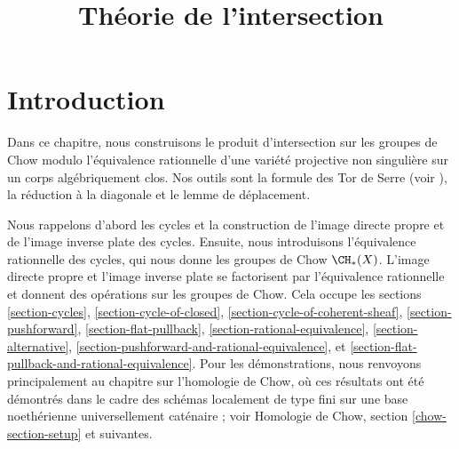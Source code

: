 

%


\title{Théorie de l'intersection}


\maketitle

\label{section-phantom}

\tableofcontents


\section{Introduction}
\label{section-introduction}

\noindent
Dans ce chapitre, nous construisons le produit d'intersection sur les groupes de Chow
modulo l'équivalence rationnelle d'une variété projective non singulière sur un
corps algébriquement clos. Nos outils sont la formule des Tor de Serre
(voir \cite[chapitre V]{Serre_algebre_locale}), la réduction à la diagonale
et le lemme de déplacement.

\medskip\noindent
Nous rappelons d'abord les cycles et la construction de l'image directe propre et de
l'image inverse plate des cycles. Ensuite, nous introduisons l'équivalence rationnelle des cycles,
qui nous donne les groupes de Chow $\CH_*(X)$. L'image directe propre et l'image inverse plate
se factorisent par l'équivalence rationnelle et donnent des opérations sur les groupes de Chow.
Cela occupe les sections
\ref{section-cycles},
\ref{section-cycle-of-closed},
\ref{section-cycle-of-coherent-sheaf},
\ref{section-pushforward},
\ref{section-flat-pullback},
\ref{section-rational-equivalence},
\ref{section-alternative},
\ref{section-pushforward-and-rational-equivalence}, et
\ref{section-flat-pullback-and-rational-equivalence}.
Pour les démonstrations, nous renvoyons principalement au chapitre sur l'homologie de Chow,
où ces résultats ont été démontrés dans le cadre des
schémas localement de type fini sur une base noethérienne universellement caténaire ; voir
Homologie de Chow, section \ref{chow-section-setup} et suivantes.

